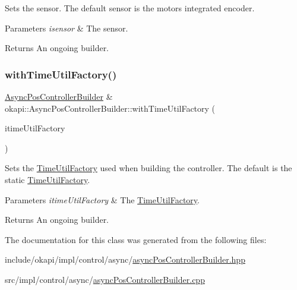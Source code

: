 Sets the sensor. The default sensor is the motor\textquotesingle{}s integrated encoder.


\begin{DoxyParams}{Parameters}
{\em isensor} & The sensor. \\
\hline
\end{DoxyParams}
\begin{DoxyReturn}{Returns}
An ongoing builder. 
\end{DoxyReturn}
\mbox{\label{classokapi_1_1AsyncPosControllerBuilder_afbec86a67bab3037b2d633dc10575702}} 
\subsubsection{\texorpdfstring{withTimeUtilFactory()}{withTimeUtilFactory()}}
{\footnotesize\ttfamily \mbox{\hyperlink{classokapi_1_1AsyncPosControllerBuilder}{Async\+Pos\+Controller\+Builder}} \& okapi\+::\+Async\+Pos\+Controller\+Builder\+::with\+Time\+Util\+Factory (\begin{DoxyParamCaption}\item[{const \mbox{\hyperlink{classokapi_1_1TimeUtilFactory}{Time\+Util\+Factory}} \&}]{itime\+Util\+Factory }\end{DoxyParamCaption})}

Sets the \mbox{\hyperlink{classokapi_1_1TimeUtilFactory}{Time\+Util\+Factory}} used when building the controller. The default is the static \mbox{\hyperlink{classokapi_1_1TimeUtilFactory}{Time\+Util\+Factory}}.


\begin{DoxyParams}{Parameters}
{\em itime\+Util\+Factory} & The \mbox{\hyperlink{classokapi_1_1TimeUtilFactory}{Time\+Util\+Factory}}. \\
\hline
\end{DoxyParams}
\begin{DoxyReturn}{Returns}
An ongoing builder. 
\end{DoxyReturn}


The documentation for this class was generated from the following files\+:\begin{DoxyCompactItemize}
\item 
include/okapi/impl/control/async/\mbox{\hyperlink{asyncPosControllerBuilder_8hpp}{async\+Pos\+Controller\+Builder.\+hpp}}\item 
src/impl/control/async/\mbox{\hyperlink{asyncPosControllerBuilder_8cpp}{async\+Pos\+Controller\+Builder.\+cpp}}\end{DoxyCompactItemize}
